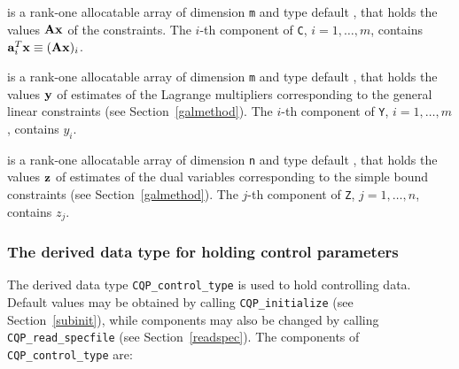 \documentclass{galahad}
\newcommand{\packagename}{CQP}
\begin{document}
\begin{description}
 is a rank-one allocatable array of dimension {\tt m} and type default
\realdp, that holds
the values ${\mathbf{A}} {\mathbf{x}}$ of the constraints.
The $i$-th component of {\tt C}, $i = 1,  \ldots ,  m$, contains
${\mathbf{a}}_{i}^{T}{\mathbf{x}} \equiv ({\mathbf{A}} {\mathbf{x}})_{i}$.

 is a rank-one allocatable array of dimension {\tt m} and type
default \realdp, that holds
the values ${\mathbf{y}}$ of estimates  of the Lagrange multipliers
corresponding to the general linear constraints (see Section~\ref{galmethod}).
The $i$-th component of {\tt Y}, $i = 1,  \ldots ,  m$, contains $y_{i}$.

 is a rank-one allocatable array of dimension {\tt n} and type default
\realdp, that holds
the values ${\mathbf{z}}$ of estimates  of the dual variables
corresponding to the simple bound constraints (see Section~\ref{galmethod}).
The $j$-th component of {\tt Z}, $j = 1,  \ldots ,  n$, contains $z_{j}$.

\end{description}


\subsubsection{The derived data type for holding control
 parameters}\label{typecontrol}
The derived data type
{\tt \packagename\_control\_type}
is used to hold controlling data. Default values may be obtained by calling
{\tt \packagename\_initialize}
(see Section~\ref{subinit}),
while components may also be changed by calling
{\tt \packagename\_read\-\_specfile}
(see Section~\ref{readspec}).
The components of
{\tt \packagename\_control\_type}
are:



\end{document}
